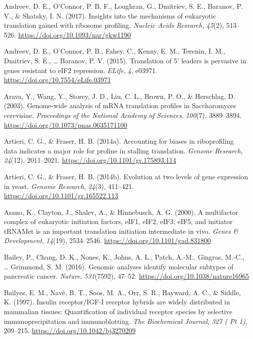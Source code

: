 \documentclass[12pt,openany]{book}
\begin{document}
\hypertarget{ref-Andreev2017}{}
Andreev, D. E., O'Connor, P. B. F., Loughran, G., Dmitriev, S. E.,
Baranov, P. V., \& Shatsky, I. N. (2017). Insights into the mechanisms
of eukaryotic translation gained with ribosome profiling. \emph{Nucleic
Acids Research}, \emph{45}(2), 513--526.
\url{https://doi.org/10.1093/nar/gkw1190}

\hypertarget{ref-Andreev2015}{}
Andreev, D. E., O'Connor, P. B., Fahey, C., Kenny, E. M., Terenin, I.
M., Dmitriev, S. E., \ldots{} Baranov, P. V. (2015). Translation of 5'
leaders is pervasive in genes resistant to eIF2 repression.
\emph{ELife}, \emph{4}, e03971.
\url{https://doi.org/10.7554/eLife.03971}

\hypertarget{ref-Arava2003}{}
Arava, Y., Wang, Y., Storey, J. D., Liu, C. L., Brown, P. O., \&
Herschlag, D. (2003). Genome-wide analysis of mRNA translation profiles
in Saccharomyces cerevisiae. \emph{Proceedings of the National Academy
of Sciences}, \emph{100}(7), 3889--3894.
\url{https://doi.org/10.1073/pnas.0635171100}

\hypertarget{ref-Artieri2014a}{}
Artieri, C. G., \& Fraser, H. B. (2014a). Accounting for biases in
riboprofiling data indicates a major role for proline in stalling
translation. \emph{Genome Research}, \emph{24}(12), 2011--2021.
\url{https://doi.org/10.1101/gr.175893.114}

\hypertarget{ref-Artieri2014}{}
Artieri, C. G., \& Fraser, H. B. (2014b). Evolution at two levels of
gene expression in yeast. \emph{Genome Research}, \emph{24}(3),
411--421. \url{https://doi.org/10.1101/gr.165522.113}

\hypertarget{ref-Asano2000}{}
Asano, K., Clayton, J., Shalev, A., \& Hinnebusch, A. G. (2000). A
multifactor complex of eukaryotic initiation factors, eIF1, eIF2, eIF3,
eIF5, and initiator tRNAMet is an important translation initiation
intermediate in vivo. \emph{Genes \& Development}, \emph{14}(19),
2534--2546. \url{https://doi.org/10.1101/gad.831800}

\hypertarget{ref-Bailey2016}{}
Bailey, P., Chang, D. K., Nones, K., Johns, A. L., Patch, A.-M.,
Gingras, M.-C., \ldots{} Grimmond, S. M. (2016). Genomic analyses
identify molecular subtypes of pancreatic cancer. \emph{Nature},
\emph{531}(7592), 47--52. \url{https://doi.org/10.1038/nature16965}

\hypertarget{ref-Bailyes1997}{}
Bailyes, E. M., Navé, B. T., Soos, M. A., Orr, S. R., Hayward, A. C., \&
Siddle, K. (1997). Insulin receptor/IGF-I receptor hybrids are widely
distributed in mammalian tissues: Quantification of individual receptor
species by selective immunoprecipitation and immunoblotting. \emph{The
Biochemical Journal}, \emph{327 ( Pt 1)}, 209--215.
\url{https://doi.org/10.1042/bj3270209}
\end{document}
